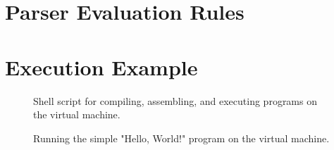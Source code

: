 \documentclass[12pt, twoside]{report}
\begin{document}
  \chapter{Parser Evaluation Rules} \label{parser-lib}
    
  
  \chapter{Execution Example} \label{run-example}
    \begin{figure}[H]
      
      \caption{
        Shell script for compiling, assembling, and executing programs on the
        virtual machine.
      }
      \label{run-sh}
    \end{figure}
    \begin{figure}[H]
      
      \caption{
        Running the simple "Hello, World!" program on the virtual machine.
      }
    \end{figure}
\end{document}
